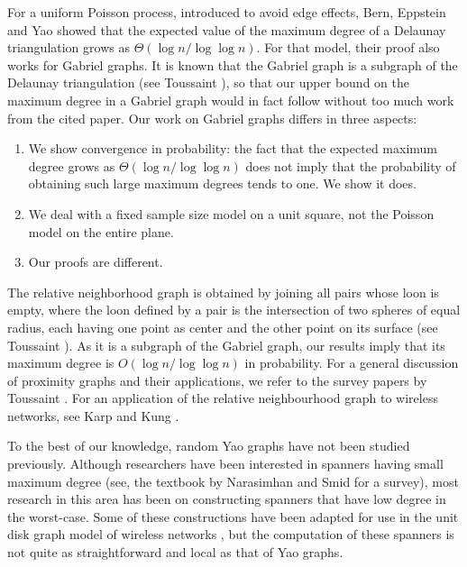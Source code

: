 \documentclass[lotsofwhite,charterfonts]{patmorin}
\begin{document}
For a uniform Poisson process, introduced to avoid edge effects, Bern,
Eppstein and Yao \cite{bey91} showed that the expected value of the maximum
degree of a Delaunay triangulation grows as $\Theta(\log n/\log\log n)$.
For that model, their proof also works for Gabriel graphs.  It is known
that the Gabriel graph is a subgraph of the Delaunay triangulation (see
Toussaint \cite{t80b}), so that our upper bound on the maximum degree in a
Gabriel graph would in fact follow without too much work from the cited
paper.  Our work on Gabriel graphs differs in three aspects:

\begin{enumerate}
\item We show convergence in probability: the fact that the expected
maximum degree grows as $\Theta(\log n /\log \log n)$ does not imply that the
probability of obtaining such large maximum degrees tends to one. We
show it does.

\item We deal with a fixed sample size model on a unit square, not the
Poisson model on the entire plane.

\item Our proofs are different.
\end{enumerate}

The relative neighborhood graph is obtained by joining all pairs whose
loon is empty, where the loon defined by a pair is the intersection of two
spheres of equal radius, each having one point as center and the other
point on its surface (see Toussaint \cite{t80a}).  As it is a subgraph of
the Gabriel graph, our results imply that its maximum degree is $O(\log
n /\log \log n)$ in probability.  For a general discussion of proximity
graphs and their applications, we refer to the survey papers by Toussaint
\cite{t80b,t82}.  For an application of the relative neighbourhood graph to
wireless networks, see Karp and Kung \cite{kk00}.

To the best of our knowledge, random Yao graphs have not been studied
previously. Although researchers have been interested in spanners having
small maximum degree (see, the textbook by Narasimhan and Smid \cite{ns07}
for a survey), most research in this area has been on constructing spanners
that have low degree in the worst-case.  Some of these constructions have
been adapted for use in the unit disk graph model of wireless networks
\cite{wl06}, but the computation of these spanners is not quite as
straightforward and local as that of Yao graphs.
\end{document}
